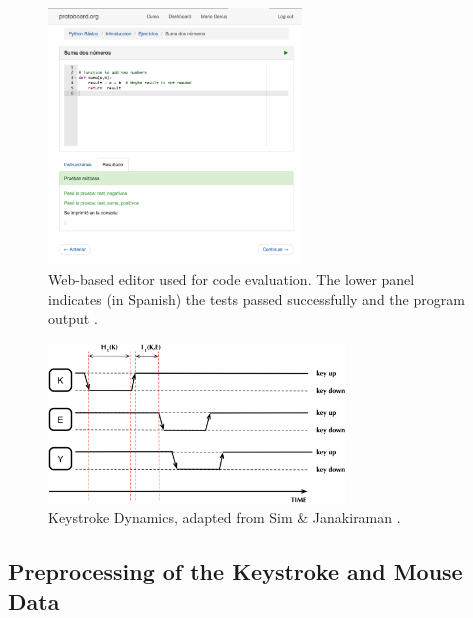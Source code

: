 \documentclass[a4paper,twoside]{article}
\begin{document}
\begin{figure}[h!tb]
\centering
\includegraphics[width=0.60\textwidth]{editorRresult.png}
\caption{Web-based editor used for code evaluation. The lower panel
  indicates (in Spanish) the tests passed successfully and the program
  output \cite{ijcci17}.}
\label{fig_editor}
\end{figure}

\begin{figure}[h!tb]
\centering
\includegraphics[width=0.70\textwidth]{KeyDyn.png}
\caption{Keystroke Dynamics, adapted from Sim \& Janakiraman \cite{sim2007digraphs}.}
\label{figKD}
\end{figure}

\subsection{Preprocessing of the Keystroke and Mouse Data}
\end{document}
